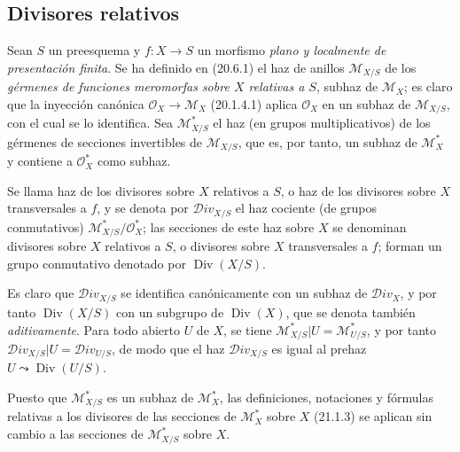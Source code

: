 \subsection{Divisores relativos}
\label{subsection:IV.21.15}
\label{IV.21.15}

\begin{env}[21.15.1]
\label{IV.21.15.1}
Sean $S$ un preesquema y $f:X\to S$ un morfismo \emph{plano y localmente de
presentación finita}. Se ha definido en (20.6.1) el haz de anillos
$\mathscr M_{X/S}$ de los \emph{gérmenes de funciones meromorfas sobre $X$ relativas a
$S$}, subhaz de $\mathscr M_X$; es claro que la inyección canónica
$\mathcal O_X\to\mathscr M_X$ (20.1.4.1) aplica $\mathcal O_X$ en un
subhaz de $\mathscr M_{X/S}$, con el cual se lo identifica. Sea
$\mathscr M_{X/S}^*$ el haz (en grupos multiplicativos) de los gérmenes de secciones
invertibles de $\mathscr M_{X/S}$, que es, por tanto, un subhaz de $\mathscr M_X^*$
y contiene a $\mathcal O_X^*$ como subhaz.
\end{env}

\begin{definition}[21.15.2]
\label{IV.21.15.2}
Se llama haz de los divisores sobre $X$ relativos a $S$, o
haz de los divisores sobre $X$ transversales a $f$, y se denota por
$\mathscr{D}iv_{X/S}$ el haz cociente (de grupos conmutativos)
$\mathscr M_{X/S}^*/\mathcal O_X^*$; las secciones de este haz sobre $X$ se
denominan divisores sobre $X$ relativos a $S$, o divisores sobre $X$
transversales a $f$; forman un grupo conmutativo denotado por $\operatorname{Div}(X/S)$.
\end{definition}

Es claro que $\mathscr{D}iv_{X/S}$ se identifica canónicamente con un subhaz de
$\mathscr{D}iv_X$, y por tanto $\operatorname{Div}(X/S)$ con un subgrupo de
$\operatorname{Div}(X)$, que se denota también \emph{aditivamente}. Para
todo abierto $U$ de $X$, se tiene
$\mathscr M_{X/S}^*|U=\mathscr M_{U/S}^*$, y por tanto
$\mathscr{D}iv_{X/S}|U=\mathscr{D}iv_{U/S}$, de modo que el haz
$\mathscr{D}iv_{X/S}$ es igual al prehaz
$U\leadsto\operatorname{Div}(U/S)$.

Puesto que $\mathscr M_{X/S}^*$ es un subhaz de $\mathscr M_X^*$, las
definiciones, notaciones y fórmulas relativas a los divisores de las secciones de
$\mathscr M_X^*$ sobre $X$ (21.1.3) se aplican sin cambio a las secciones
de $\mathscr M_{X/S}^*$ sobre $X$.

